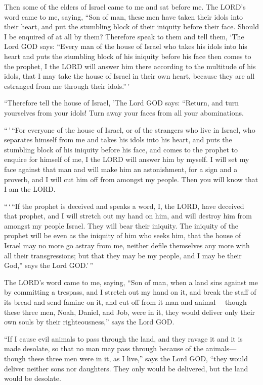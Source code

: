  Then some of the elders of Israel came to me and sat before
me.  The LORD's word came to me, saying,  ``Son
of man, these men have taken their idols into their heart, and put the
stumbling block of their iniquity before their face. Should I be
enquired of at all by them?  Therefore speak to them and
tell them, `The Lord GOD says: ``Every man of the house of Israel who
takes his idols into his heart and puts the stumbling block of his
iniquity before his face then comes to the prophet, I the LORD will
answer him there according to the multitude of his idols, 
that I may take the house of Israel in their own heart, because they are
all estranged from me through their idols.''\,'

 ``Therefore tell the house of Israel, 'The Lord GOD says:
``Return, and turn yourselves from your idols! Turn away your faces from
all your abominations.

 ``\,'\,``For everyone of the house of Israel, or of the
strangers who live in Israel, who separates himself from me and takes
his idols into his heart, and puts the stumbling block of his iniquity
before his face, and comes to the prophet to enquire for himself of me,
I the LORD will answer him by myself.  I will set my face
against that man and will make him an astonishment, for a sign and a
proverb, and I will cut him off from amongst my people. Then you will
know that I am the LORD.

 ``\,`\,``If the prophet is deceived and speaks a word, I,
the LORD, have deceived that prophet, and I will stretch out my hand on
him, and will destroy him from amongst my people Israel. 
They will bear their iniquity. The iniquity of the prophet will be even
as the iniquity of him who seeks him,  that the house of
Israel may no more go astray from me, neither defile themselves any more
with all their transgressions; but that they may be my people, and I may
be their God,'' says the Lord GOD.'\,''

 The LORD's word came to me, saying,  ``Son of
man, when a land sins against me by committing a trespass, and I stretch
out my hand on it, and break the staff of its bread and send famine on
it, and cut off from it man and animal---  though these
three men, Noah, Daniel, and Job, were in it, they would deliver only
their own souls by their righteousness,'' says the Lord GOD.

 ``If I cause evil animals to pass through the land, and
they ravage it and it is made desolate, so that no man may pass through
because of the animals---  though these three men were in
it, as I live,'' says the Lord GOD, ``they would deliver neither sons
nor daughters. They only would be delivered, but the land would be
desolate.

